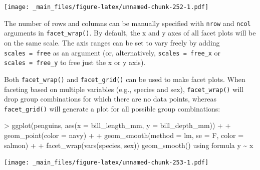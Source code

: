 \documentclass[
]{book}
\newenvironment{Shaded}{\begin{snugshade}}{\end{snugshade}}
\newcommand{\AttributeTok}[1]{\textcolor[rgb]{0.77,0.63,0.00}{#1}}
\newcommand{\FunctionTok}[1]{\textcolor[rgb]{0.00,0.00,0.00}{#1}}
\newcommand{\NormalTok}[1]{#1}
\newcommand{\SpecialCharTok}[1]{\textcolor[rgb]{0.00,0.00,0.00}{#1}}
\newcommand{\StringTok}[1]{\textcolor[rgb]{0.31,0.60,0.02}{#1}}
\begin{document}
\texttt{[image: \_main\_files/figure-latex/unnamed-chunk-252-1.pdf]}

The number of rows and columns can be manually specified with \texttt{nrow} and \texttt{ncol} arguments in \texttt{facet\_wrap()}. By default, the x and y axes of all facet plots will be on the same scale. The axis ranges can be set to vary freely by adding \texttt{scales\ =\ \textquotesingle{}free\textquotesingle{}} as an argument (or, alternatively, \texttt{scales\ =\ \textquotesingle{}free\_x\textquotesingle{}} or \texttt{scales\ =\ \textquotesingle{}free\_y\textquotesingle{}} to free just the x or y axis).

Both \texttt{facet\_wrap()} and \texttt{facet\_grid()} can be used to make facet plots. When faceting based on multiple variables (e.g., species and sex), \texttt{facet\_wrap()} will drop group combinations for which there are no data points, whereas \texttt{facet\_grid()} will generate a plot for all possible group combinations:

\begin{Shaded}
\begin{Highlighting}[]
\SpecialCharTok{\textgreater{}} \FunctionTok{ggplot}\NormalTok{(penguins, }\FunctionTok{aes}\NormalTok{(}\AttributeTok{x =}\NormalTok{ bill\_length\_mm, }\AttributeTok{y =}\NormalTok{ bill\_depth\_mm)) }\SpecialCharTok{+}
\SpecialCharTok{+}   \FunctionTok{geom\_point}\NormalTok{(}\AttributeTok{color =} \StringTok{\textquotesingle{}navy\textquotesingle{}}\NormalTok{) }\SpecialCharTok{+}
\SpecialCharTok{+}   \FunctionTok{geom\_smooth}\NormalTok{(}\AttributeTok{method =} \StringTok{\textquotesingle{}lm\textquotesingle{}}\NormalTok{, }\AttributeTok{se =}\NormalTok{ F, }\AttributeTok{color =} \StringTok{\textquotesingle{}salmon\textquotesingle{}}\NormalTok{) }\SpecialCharTok{+}
\SpecialCharTok{+}   \FunctionTok{facet\_wrap}\NormalTok{(}\FunctionTok{vars}\NormalTok{(species, sex))}
\StringTok{\textasciigrave{}}\AttributeTok{geom\_smooth()}\StringTok{\textasciigrave{}}\NormalTok{ using formula }\StringTok{\textquotesingle{}y \textasciitilde{} x\textquotesingle{}}
\end{Highlighting}
\end{Shaded}

\texttt{[image: \_main\_files/figure-latex/unnamed-chunk-253-1.pdf]}
\end{document}
